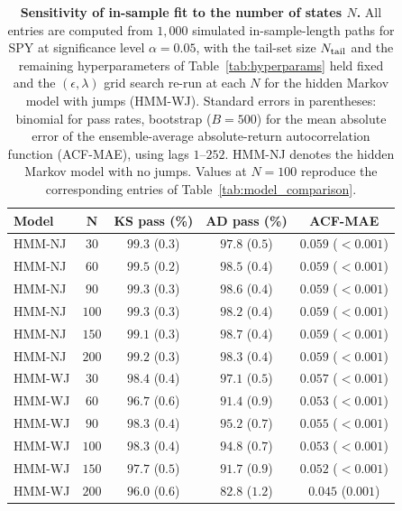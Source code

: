 \begin{table}[H]
\centering
\caption{\textbf{Sensitivity of in-sample fit to the number of
    states $N$.} All entries are computed from $1{,}000$ simulated
    in-sample-length paths for SPY at significance level
    $\alpha = 0.05$, with the tail-set size $N_{\rm tail}$ and the
    remaining hyperparameters of Table~\ref{tab:hyperparams} held
    fixed and the $(\epsilon, \lambda)$ grid search re-run at each
    $N$ for the hidden Markov model with jumps (HMM-WJ). Standard
    errors in parentheses: binomial for pass rates, bootstrap
    ($B = 500$) for the mean absolute error of the ensemble-average
    absolute-return autocorrelation function (ACF-MAE), using lags $1$--$252$. HMM-NJ denotes the hidden
    Markov model with no jumps. Values at $N = 100$ reproduce the
    corresponding entries of Table~\ref{tab:model_comparison}.}
\label{tab:sensitivity_n}
\small
\begin{tabular}{@{}lcccc@{}}
\toprule
\textbf{Model} & $\boldsymbol{N}$ & \textbf{KS pass (\%)} &
  \textbf{AD pass (\%)} & \textbf{ACF-MAE} \\ \midrule
HMM-NJ & $30$  & $99.3$ ($0.3$) & $97.8$ ($0.5$) & $0.059$ ($<\!0.001$) \\
HMM-NJ & $60$  & $99.5$ ($0.2$) & $98.5$ ($0.4$) & $0.059$ ($<\!0.001$) \\
HMM-NJ & $90$  & $99.3$ ($0.3$) & $98.6$ ($0.4$) & $0.059$ ($<\!0.001$) \\
HMM-NJ & $100$ & $99.3$ ($0.3$) & $98.2$ ($0.4$) & $0.059$ ($<\!0.001$) \\
HMM-NJ & $150$ & $99.1$ ($0.3$) & $98.7$ ($0.4$) & $0.059$ ($<\!0.001$) \\
HMM-NJ & $200$ & $99.2$ ($0.3$) & $98.3$ ($0.4$) & $0.059$ ($<\!0.001$) \\ \midrule
HMM-WJ & $30$  & $98.4$ ($0.4$) & $97.1$ ($0.5$) & $0.057$ ($<\!0.001$) \\
HMM-WJ & $60$  & $96.7$ ($0.6$) & $91.4$ ($0.9$) & $0.053$ ($<\!0.001$) \\
HMM-WJ & $90$  & $98.3$ ($0.4$) & $95.2$ ($0.7$) & $0.055$ ($<\!0.001$) \\
HMM-WJ & $100$ & $98.3$ ($0.4$) & $94.8$ ($0.7$) & $0.053$ ($<\!0.001$) \\
HMM-WJ & $150$ & $97.7$ ($0.5$) & $91.7$ ($0.9$) & $0.052$ ($<\!0.001$) \\
HMM-WJ & $200$ & $96.0$ ($0.6$) & $82.8$ ($1.2$) & $0.045$ ($0.001$) \\
\bottomrule
\end{tabular}
\end{table}


